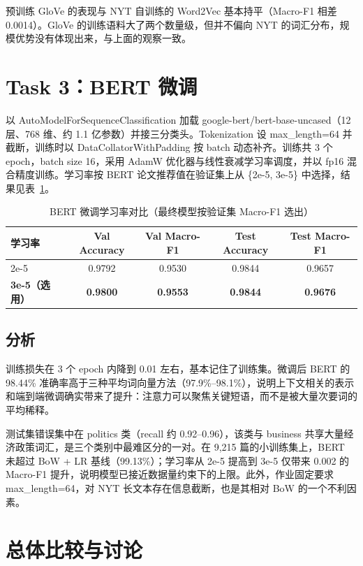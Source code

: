 \documentclass[UTF8,a4paper,10pt]{ctexart}
\begin{document}
预训练 GloVe 的表现与 NYT 自训练的 Word2Vec 基本持平（Macro-F1 相差 0.0014）。GloVe 的训练语料大了两个数量级，但并不偏向 NYT 的词汇分布，规模优势没有体现出来，与上面的观察一致。

\section{Task 3：BERT 微调}

以 AutoModelForSequenceClassification 加载 google-bert/bert-base-uncased（12 层、768 维、约 1.1 亿参数）并接三分类头。Tokenization 设 max\_length=64 并截断，训练时以 DataCollatorWithPadding 按 batch 动态补齐。训练共 3 个 epoch，batch size 16，采用 AdamW 优化器与线性衰减学习率调度，并以 fp16 混合精度训练。学习率按 BERT 论文推荐值在验证集上从 \{2e-5, 3e-5\} 中选择，结果见表~\ref{tab:bert}。

\begin{table}[!htbp]
  \centering
  \begin{tabular}{lcccc}
  \toprule
  学习率 & Val Accuracy & Val Macro-F1 & Test Accuracy & Test Macro-F1 \\
  \midrule
  2e-5 & 0.9792 & 0.9530 & 0.9844 & 0.9657 \\
  \textbf{3e-5（选用）} & \textbf{0.9800} & \textbf{0.9553} & \textbf{0.9844} & \textbf{0.9676} \\
  \bottomrule
  \end{tabular}
  \caption{BERT 微调学习率对比（最终模型按验证集 Macro-F1 选出）}
  \label{tab:bert}
\end{table}

\subsection{分析}

训练损失在 3 个 epoch 内降到 0.01 左右，基本记住了训练集。微调后 BERT 的 98.44\% 准确率高于三种平均词向量方法（97.9\%--98.1\%），说明上下文相关的表示和端到端微调确实带来了提升：注意力可以聚焦关键短语，而不是被大量次要词的平均稀释。

测试集错误集中在 politics 类（recall 约 0.92--0.96），该类与 business 共享大量经济政策词汇，是三个类别中最难区分的一对。在 9,215 篇的小训练集上，BERT 未超过 BoW + LR 基线（99.13\%）；学习率从 2e-5 提高到 3e-5 仅带来 0.002 的 Macro-F1 提升，说明模型已接近数据量约束下的上限。此外，作业固定要求 max\_length=64，对 NYT 长文本存在信息截断，也是其相对 BoW 的一个不利因素。

\section{总体比较与讨论}
\end{document}
